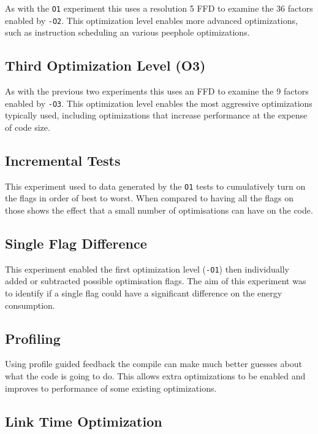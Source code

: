 \documentclass[twocolumn]{article}
\begin{document}
As with the \texttt{O1} experiment this uses a resolution 5 FFD to examine the 36 factors enabled by \texttt{-O2}. This optimization level enables more advanced optimizations, such as instruction scheduling an various peephole optimizations.

\subsection*{Third Optimization Level (O3)}

As with the previous two experiments this uses an FFD to examine the 9 factors enabled by \texttt{-O3}. This optimization level enables the most aggressive optimizations typically used, including optimizations that increase performance at the expense of code size.

\subsection*{Incremental Tests}

This experiment used to data generated by the \texttt{O1} tests to cumulatively turn on the flags in order of best to worst. When compared to having all the flags on those shows the effect that a small number of optimisations can have on the code.

\subsection*{Single Flag Difference}

This experiment enabled the first optimization level (\texttt{-O1}) then individually added or subtracted possible optimisation flags. The aim of this experiment was to identify if a single flag could have a significant difference on the energy consumption.

\subsection*{Profiling}

Using profile guided feedback the compile can make much better guesses about what the code is going to do. This allows extra optimizations to be enabled and improves to performance of some existing optimizations.

\subsection*{Link Time Optimization}
\end{document}

